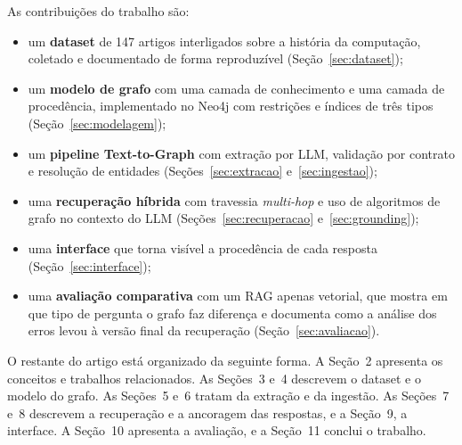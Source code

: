 As contribuições do trabalho são:
\begin{itemize}
  \item um \textbf{dataset} de 147 artigos interligados sobre a história da computação, coletado e documentado de forma reproduzível (Seção~\ref{sec:dataset});
  \item um \textbf{modelo de grafo} com uma camada de conhecimento e uma camada de procedência, implementado no Neo4j com restrições e índices de três tipos (Seção~\ref{sec:modelagem});
  \item um \textbf{pipeline Text-to-Graph} com extração por LLM, validação por contrato e resolução de entidades (Seções~\ref{sec:extracao} e~\ref{sec:ingestao});
  \item uma \textbf{recuperação híbrida} com travessia \emph{multi-hop} e uso de algoritmos de grafo no contexto do LLM (Seções~\ref{sec:recuperacao} e~\ref{sec:grounding});
  \item uma \textbf{interface} que torna visível a procedência de cada resposta (Seção~\ref{sec:interface});
  \item uma \textbf{avaliação comparativa} com um RAG apenas vetorial, que mostra em que tipo de pergunta o grafo faz diferença e documenta como a análise dos erros levou à versão final da recuperação (Seção~\ref{sec:avaliacao}).
\end{itemize}

O restante do artigo está organizado da seguinte forma. A Seção~2 apresenta os conceitos e trabalhos relacionados. As Seções~3 e~4 descrevem o dataset e o modelo do grafo. As Seções~5 e~6 tratam da extração e da ingestão. As Seções~7 e~8 descrevem a recuperação e a ancoragem das respostas, e a Seção~9, a interface. A Seção~10 apresenta a avaliação, e a Seção~11 conclui o trabalho.
